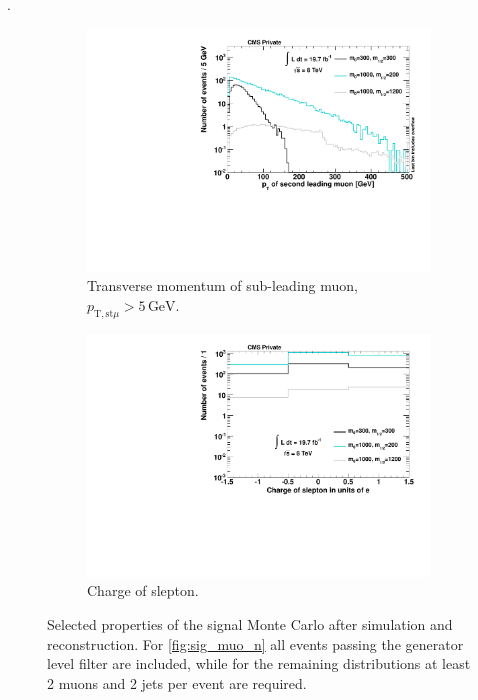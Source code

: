 .

\begin{figure}[!htbp]
  \ContinuedFloat
  \centering
  \begin{subfigure}[b]{0.495\textwidth}
    \centering
    \includegraphics[width=\textwidth]{plots/sig_muo_pt2.pdf}
    \caption{Transverse momentum of sub-leading muon, $p_{\text{T}, \text{st} \mu} > 5\,\text{GeV}$.\label{fig:sig_muo_pt2}}
  \end{subfigure}
  \begin{subfigure}[b]{0.495\textwidth}
    \centering
    \includegraphics[width=\textwidth]{plots/sig_slepton_charge.pdf}
    \caption{Charge of slepton.\label{fig:sig_slepton_charge}}
  \end{subfigure}
  \caption{Selected properties of the signal Monte Carlo after simulation and reconstruction. For \ref{fig:sig_muo_n} all events passing the generator level filter are included, while for the remaining distributions at least 2 muons and 2 jets per event are required.}
  \label{fig:signal_properties}
\end{figure}


